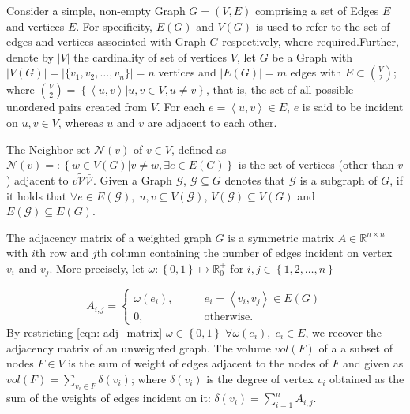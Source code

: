 Consider a simple, non-empty Graph $G = (V, E)$ comprising a set of Edges $E$ and vertices $E$.
For specificity, $E(G)$ and $V(G)$ is used to refer to the set of edges and vertices associated
with Graph $G$ respectively, where required.Further, denote by $|V|$ the cardinality of set of
vertices $V$, let $G$ be a Graph with $|V(G)| = |\{v_1, v_2, \ldots, v_n \}| = n$ vertices and
$|E(G)| = m$ edges with $E \subset \binom{V}{2} $;
where $\binom{V}{2} = \left\{\left\langle u,v\right\rangle | u,v \in V, u \neq v \right\} $, that is,
the set of all possible unordered pairs created from $V$. For each $e = \left\langle u, v\right\rangle \in E$,
$e$ is said to be incident on $u,v\in V$, whereas $u$ and $v$ are adjacent to each other.

The Neighbor set $\mathcal{N}(v)$ of $v \in V$, defined as
$\mathcal{N}(v) =: \left\{w  \in V(G) | v \neq w, \exists e \in E(G)\right\} $  is the set of vertices
(other than $v$) adjacent to $v \tilde{\mathcal{V}}  \bar{\mathcal{V}}$. Given a Graph $\mathcal{G}$,
$\mathcal{G} \subseteq G$ denotes that $\mathcal{G}$ is a subgraph of $G$, if it holds that
$\forall e \in E(\mathcal{G}),  \; u,v \subseteq V(\mathcal{G})$, $V(\mathcal{G}) \subseteq V(G)$
and $E(\mathcal{G}) \subseteq E(G)$.

The adjacency matrix of a weighted graph $G$ is a symmetric matrix $A \in \mathbb{R}^{n \times n}$ with $i$th row and $j$th
column containing the number of edges incident on vertex $v_i$ and $v_j$. More precisely,
let $\omega : \left\{ 0,1 \right\} \mapsto \mathbb{R}^+_0$ for $i,j \in \left\{1,2, \ldots, n \right\} $

\begin{equation}\label{eqn: adj_matrix}
  A_{i,j} = \begin{cases}
    \omega (e_i), & \qquad e_i = \left\langle v_i, v_j\right\rangle \in E(G) \\
    0,            & \qquad \text{otherwise.}
  \end{cases}
\end{equation}
By restricting \eqref{eqn: adj_matrix} $\omega \in \left\{ 0,1 \right\} \;\forall  \omega  (e_i), \; e_i  \in E$, we recover the
adjacency matrix of an unweighted graph. The volume $vol(F)$ of a a subset of nodes $F \in V$ is the sum of weight of edges adjacent
to the nodes of $F$ and given as $vol(F) = \sum_{v_i \in F}  \delta(v_i)$; where $\delta(v_i)$ is the degree of vertex $v_i$ obtained
as the sum of the weights of edges incident on it: $\delta(v_i) = \sum_{i = 1}^{n} A_{i,j} $.

